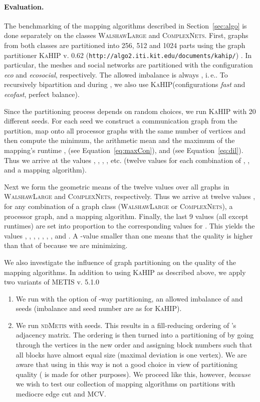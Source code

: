 \documentclass[pdftex]{llncs}
\newcommand{\ie}{i.\,e.\xspace}
\newcommand{\metis}{\textsc{METIS}\xspace}
\newcommand{\ndmetis}{\textsc{ndMetis}\xspace}
\newcommand{\kahip}{\textsc{KaHIP}\xspace}
\newcommand{\walshawlarge}{\textsc{WalshawLarge}\xspace}
\newcommand{\complexnets}{\textsc{ComplexNets}\xspace}
\begin{document}
\paragraph{Evaluation.}
\label{sub:exp-evaluation}
The benchmarking of the mapping algorithms described in
Section~\ref{sec:algo} is done separately on the classes \walshawlarge
and \complexnets. First, graphs from both classes are partitioned into
256, 512 and 1024 parts using the graph partitioner \kahip v. 0.62
({\tt http://algo2.iti.kit.edu/documents/kahip/})
\cite{dissSchulz}.
In particular,
the meshes and social networks are partitioned with the configuration
\emph{eco} and \emph{ecosocial}, respectively. The allowed imbalance
is always , \ie . To recursively bipartition  and  during
, we also use \kahip (configurations \emph{fast} and
\emph{ecofast}, perfect balance).

Since the partitioning process depends on random choices, we run \kahip with 20
different seeds.  For each seed we construct a communication graph
 from the partition, map  onto all processor graphs with the
same number of vertices and then compute the minimum, the arithmetic
mean and the maximum of the mapping's runtime ,  (see
Equation~\ref{eq:maxCon}),  and  (see
Equation~\ref{eq:dil}). Thus we arrive at the values ,
, , , etc. (twelve values for each
combination of , , and a mapping algorithm).

Next we form the geometric means of the twelve values over all graphs
in \walshawlarge and \complexnets, respectively. Thus we arrive at
twelve values ,  for any combination of a graph
class (\walshawlarge or \complexnets), a processor graph, and a
mapping algorithm. Finally, the last 9 values (all except runtimes) are
set into proportion to the corresponding values for . This
yields the values , ,
, , ,
, ,  and
. A -value smaller than one means that the
quality is higher than that of  because we are minimizing.

We also investigate the influence of graph partitioning on the quality
of the mapping algorithms. In addition to using \kahip as described
above, we apply two variants of \metis v. 5.1.0~\cite{Karypis13a}

\begin{enumerate}
\item We run  with the option of -way partitioning, an
  allowed imbalance of  and  seeds (imbalance and 
  seed number are as for \kahip).
\item We run \ndmetis with  seeds. This results in a fill-reducing
  ordering of 's adjacency matrix. The ordering is then turned
  into a partitioning of  by going through the vertices in the
  new order and assigning block numbers such that all blocks have
  almost equal size (maximal deviation is one vertex). We are aware
  that using  in this way is not a good choice in view of
  partitioning quality ( is made for other purposes). We
  proceed like this, however, \emph{because} we wish to test our
  collection of mapping algorithms on partitions with mediocre edge cut
  and MCV.
\end{enumerate}
\end{document}
